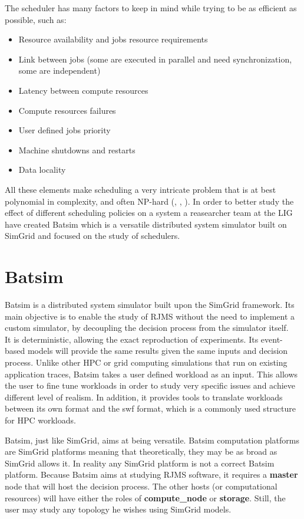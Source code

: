 The scheduler has many factors to keep in mind while trying to be as efficient
as possible, such as:

\begin{itemize}
	\item Resource availability and jobs resource requirements
	\item Link between jobs (some are executed in parallel and need synchronization, some are independent)
	\item Latency between compute resources
	\item Compute resources failures
	\item User defined jobs priority
	\item Machine shutdowns and restarts
	\item Data locality
\end{itemize}

All these elements make scheduling a very intricate problem that is at best
polynomial in complexity, and often NP-hard
(\cite{10.1016/S0022-0000(75)80008-0}, \cite{scheduler-complexity}, \cite{BLAZEWICZ198311}). In order
to better study the effect of different scheduling policies on a system a
reasearcher team at the LIG have created Batsim which is a versatile
distributed system simulator built on SimGrid and focused on the study of
schedulers.


\section{Batsim}

Batsim\cite{dutot:hal-01333471} is a distributed system simulator built upon
the SimGrid framework. Its main objective is to enable the study of RJMS
without the need to implement a custom simulator, by decoupling the decision
process from the simulator itself.\\

It is deterministic, allowing the exact reproduction of experiments.  Its
event-based models will provide the same results given the same inputs and
decision process.  Unlike other HPC or grid computing simulations that run on
existing application traces, Batsim takes a user defined workload as an input.
This allows the user to fine tune workloads in order to study very specific
issues and achieve different level of realism. In addition, it provides tools
to translate workloads between its own format and the swf format, which is a
commonly used structure for HPC workloads.

Batsim, just like SimGrid, aims at being versatile. 
Batsim computation platforms are
SimGrid platforms meaning that theoretically, they may be as broad as SimGrid
allows it. In reality any SimGrid platform is not a correct Batsim platform.
Because Batsim aims at studying RJMS software, it requires a \textbf{master}
node that will host the decision process. The other hosts (or computational
resources) will have either the roles of \textbf{compute\_node} or
\textbf{storage}. Still, the user may study any topology he wishes using
SimGrid models.

